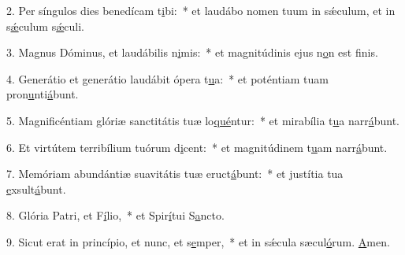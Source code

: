 2. Per síngulos dies benedícam t\uline{i}bi:~* et laudábo nomen tuum in sǽculum, et in s\uline{ǽ}culum s\uline{ǽ}culi.\par 
3. Magnus Dóminus, et laudábilis n\uline{i}mis:~* et magnitúdinis ejus n\uline{o}n est f\uline{i}nis.\par 
4. Generátio et generátio laudábit ópera t\uline{u}a:~* et poténtiam tuam pron\uline{u}nti\uline{á}bunt.\par 
5. Magnificéntiam glóriæ sanctitátis tuæ lo\uline{qué}ntur:~* et mirabília t\uline{u}a narr\uline{á}bunt.\par 
6. Et virtútem terribílium tuórum d\uline{i}cent:~* et magnitúdinem t\uline{u}am narr\uline{á}bunt.\par 
7. Memóriam abundántiæ suavitátis tuæ eruct\uline{á}bunt:~* et justítia tua \uline{e}xsult\uline{á}bunt.\par 
8. Glória Patri, et F\uline{í}lio,~* et Spir\uline{í}tui S\uline{a}ncto.\par 
9. Sicut erat in princípio, et nunc, et s\uline{e}mper,~* et in sǽcula sæcul\uline{ó}rum. \uline{A}men.\par 
